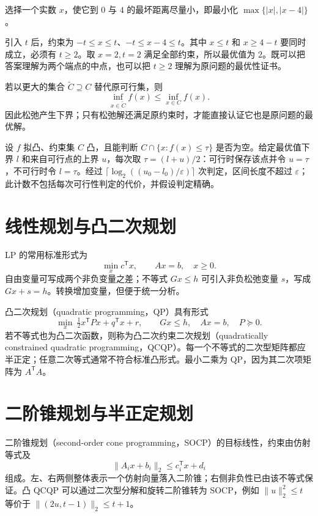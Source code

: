 \documentclass[UTF8,12pt,a4paper,fontset=fandol]{ctexbook}
\begin{document}
\begin{example}[极小极大问题的手算与线性规划]
选择一个实数 $x$，使它到 $0$ 与 $4$ 的最坏距离尽量小，即最小化 $\max\{|x|,|x-4|\}$。
\end{example}
\begin{solve}
引入 $t$ 后，约束为 $-t\leq x\leq t$、$-t\leq x-4\leq t$。其中 $x\leq t$ 和 $x\geq4-t$ 要同时成立，必须有 $t\geq2$。取 $x=2,t=2$ 满足全部约束，所以最优值为 $2$。既可以把答案理解为两个端点的中点，也可以把 $t\geq2$ 理解为原问题的最优性证书。
\end{solve}

若以更大的集合 $\widetilde C\supseteq C$ 替代原可行集，则
\[
 \inf_{x\in\widetilde C}f(x)\leq\inf_{x\in C}f(x).
\]
因此松弛产生下界；只有松弛解还满足原约束时，才能直接认证它也是原问题的最优解。

设 $f$ 拟凸、约束集 $C$ 凸，且能判断 $C\cap\{x:f(x)\leq\tau\}$ 是否为空。给定最优值下界 $l$ 和来自可行点的上界 $u$，每次取 $\tau=(l+u)/2$：可行时保存该点并令 $u=\tau$，不可行时令 $l=\tau$。经过 $\lceil\log_2((u_0-l_0)/\varepsilon)\rceil$ 次判定，区间长度不超过 $\varepsilon$；此计数不包括每次可行性判定的代价，并假设判定精确。

\section{线性规划与凸二次规划}

LP 的常用标准形式为
\[
 \min_x c^{\mathsf T}x,\qquad Ax=b,\quad x\geq0.
\]
自由变量可写成两个非负变量之差；不等式 $Gx\leq h$ 可引入非负松弛变量 $s$，写成 $Gx+s=h$。转换增加变量，但便于统一分析。

凸二次规划（quadratic programming，QP）具有形式
\[
 \min_x\ \tfrac12x^{\mathsf T}Px+q^{\mathsf T}x+r,
 \qquad Gx\leq h,\quad Ax=b,\quad P\succeq0.
\]
若不等式也为凸二次函数，则称为凸二次约束二次规划（quadratically constrained quadratic programming，QCQP）。每一个不等式的二次型矩阵都应半正定；任意二次等式通常不符合标准凸形式。最小二乘为 QP，因为其二次项矩阵为 $A^{\mathsf T}A$。

\section{二阶锥规划与半正定规划}

二阶锥规划（second-order cone programming，SOCP）的目标线性，约束由仿射等式及
\[
 \|A_i x+b_i\|_2\leq c_i^{\mathsf T}x+d_i
\]
组成。左、右两侧整体表示一个仿射向量落入二阶锥；右侧非负性已由该不等式保证。凸 QCQP 可以通过二次型分解和旋转二阶锥转为 SOCP，例如 $\|u\|_2^2\leq t$ 等价于 $\|(2u,t-1)\|_2\leq t+1$。
\end{document}
